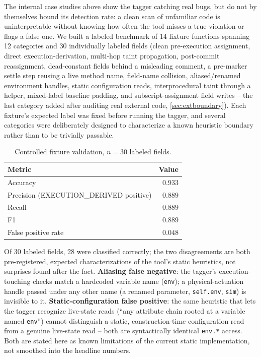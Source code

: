 \documentclass[journal]{IEEEtran}
\begin{document}
The internal case studies above show the tagger catching real bugs, but do
not by themselves bound its detection rate: a clean scan of unfamiliar
code is uninterpretable without knowing how often the tool misses a true
violation or flags a false one. We built a labeled benchmark of 14 fixture
functions spanning 12 categories and 30 individually labeled fields
(clean pre-execution assignment, direct execution-derivation, multi-hop
taint propagation, post-commit reassignment, dead-constant fields behind a
misleading comment, a pre-marker settle step reusing a live method name,
field-name collision, aliased/renamed environment handles, static
configuration reads, interprocedural taint through a helper, mixed-label
baseline padding, and subscript-assignment field writes -- the last
category added after auditing real external code, \cref{sec:extboundary}).
Each fixture's expected label was fixed before running the tagger, and
several categories were deliberately designed to characterize a known
heuristic boundary rather than to be trivially passable.

\begin{table}[t]
\centering
\caption{Controlled fixture validation, $n=30$ labeled fields.}
\label{tab:fixturevalidation}
\begin{tabular}{@{}lr@{}}
\toprule
Metric & Value \\
\midrule
Accuracy & $0.933$ \\
Precision (EXECUTION\_DERIVED positive) & $0.889$ \\
Recall & $0.889$ \\
F1 & $0.889$ \\
False positive rate & $0.048$ \\
\bottomrule
\end{tabular}
\end{table}

Of 30 labeled fields, 28 were classified correctly; the two disagreements
are both pre-registered, expected characterizations of the tool's static
heuristics, not surprises found after the fact. \textbf{Aliasing false
negative}: the tagger's execution-touching checks match a hardcoded
variable name (\texttt{env}); a physical-actuation handle passed under any
other name (a renamed parameter, \texttt{self.env}, \texttt{sim}) is
invisible to it. \textbf{Static-configuration false positive}: the same
heuristic that lets the tagger recognize live-state reads
(``any attribute chain rooted at a variable named \texttt{env}'') cannot
distinguish a static, construction-time configuration read from a genuine
live-state read -- both are syntactically identical \texttt{env.*} access.
Both are stated here as known limitations of the current static
implementation, not smoothed into the headline numbers.
\end{document}
